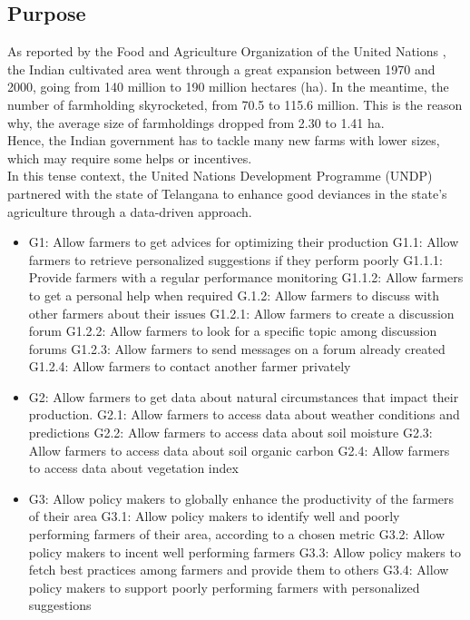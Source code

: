 \subsection{Purpose}
As reported by the Food and Agriculture Organization of the United Nations \cite{fao}, the Indian cultivated area went through a great expansion between 1970 and 2000, going from 140 million to 190 million hectares (ha). In the meantime, the number of farmholding skyrocketed, from 70.5 to 115.6 million. This is the reason why, the average size of farmholdings dropped from 2.30 to 1.41 ha. 
\\
Hence, the Indian government has to tackle many new farms with lower sizes, which may require some helps or incentives.
\\
In this tense context, the United Nations Development Programme (UNDP) partnered with the state of Telangana to enhance good deviances in the state's agriculture through a data-driven approach. 

\begin{itemize}
	\item
	G1: Allow farmers to get advices for optimizing their production
	\subitem
	G1.1: Allow farmers to retrieve personalized suggestions if they perform poorly
	\subsubitem
	G1.1.1: Provide farmers with a regular performance monitoring
	\subsubitem
	G1.1.2: Allow farmers to get a personal help when required
	\subitem
	G.1.2: Allow farmers to discuss with other farmers about their issues
	\subsubitem
	G1.2.1: Allow farmers to create a discussion forum
	\subsubitem
	G1.2.2: Allow farmers to look for a specific topic among discussion forums
	\subsubitem
	G1.2.3: Allow farmers to send messages on a forum already created
	\subsubitem
	G1.2.4: Allow farmers to contact another farmer privately	
	\item
	G2: Allow farmers to get data about natural circumstances that impact their production. 
	\subitem
	G2.1: Allow farmers to access data about weather conditions and predictions
	\subitem
	G2.2:
	Allow farmers to access data about soil moisture
	\subitem
	G2.3:
	Allow farmers to access data about soil organic carbon
	\subitem
	G2.4:
	Allow farmers to access data about vegetation index
	\item
	G3: Allow policy makers to globally enhance the productivity of the farmers of their area
	\subitem
	G3.1: Allow policy makers to identify well and poorly performing farmers of their area, according to a chosen metric
	\subitem
	G3.2: Allow policy makers to incent well performing farmers
	\subitem
	G3.3: Allow policy makers to fetch best practices among farmers and provide them to others
	\subitem
	G3.4: Allow policy makers to support poorly performing farmers with personalized suggestions

	
\end{itemize}

